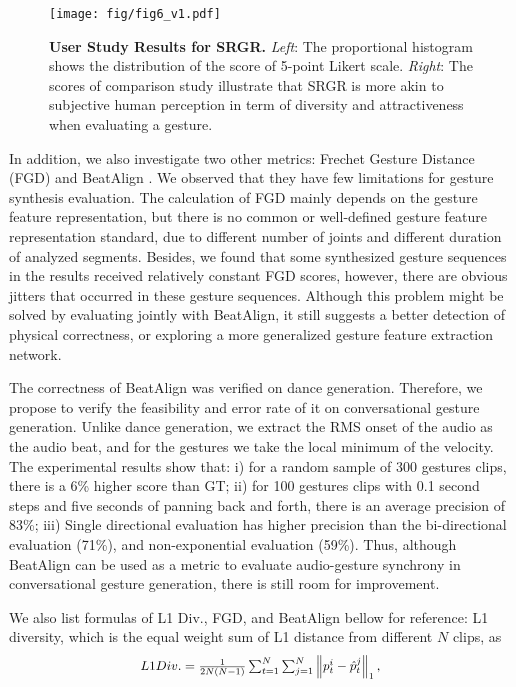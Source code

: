 \documentclass[runningheads]{llncs}
\begin{document}
\begin{figure}
\centering
    \texttt{[image: fig/fig6\_v1.pdf]}
    \caption{
\textbf{User Study Results for SRGR.} \textit{Left}: The proportional histogram shows the distribution of the score of 5-point Likert scale. \textit{Right}: The scores of comparison study illustrate that SRGR is more akin to subjective human perception in term of diversity and attractiveness when evaluating a gesture.
}
    \label{fig:spfig7}
\end{figure}


In addition, we also investigate two other metrics: Frechet Gesture Distance (FGD) \cite{yoon2020speech} and BeatAlign \cite{li2021ai}. We observed that they have few limitations for gesture synthesis evaluation. The calculation of FGD mainly depends on the gesture feature representation, but there is no common or well-defined gesture feature representation standard, due to different number of joints and different duration of analyzed segments. Besides, we found that some synthesized gesture sequences in the results received relatively constant FGD scores, however, there are obvious jitters that occurred in these gesture sequences. Although this problem might be solved by evaluating jointly with BeatAlign, it still suggests a better detection of physical correctness, or exploring a more generalized gesture feature extraction network.

The correctness of BeatAlign \cite{li2021ai} was verified on dance generation. Therefore, we propose to verify the feasibility and error rate of it on conversational gesture generation. Unlike dance generation, we extract the RMS onset of the audio as the audio beat, and for the gestures we take the local minimum of the velocity. The experimental results show that: i) for a random sample of 300 gestures clips, there is a 6\% higher score than GT; ii) for 100 gestures clips with 0.1 second steps and five seconds of panning back and forth, there is an average precision of 83\%; iii) Single directional evaluation has higher precision than the bi-directional evaluation (71\%), and non-exponential evaluation (59\%). Thus, although BeatAlign can be used as a metric to evaluate audio-gesture synchrony in conversational gesture generation, there is still room for improvement.

We also list formulas of L1 Div., FGD, and BeatAlign bellow for reference:
L1 diversity, which is the equal weight sum of L1 distance from different $N$ clips, as
\begin{equation}
\resizebox{.50\hsize}{!}{$
    L1 Div. =  \frac{1}{2 N (N-1)} \sum_{t=1}^{N} \sum_{j=1}^{N} \left\|p_{t}^{i}-\hat{p}_{t}^{j}\right\|_{1},$} 
\end{equation}
\end{document}

